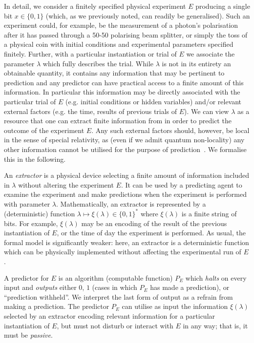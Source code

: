 \documentclass[%
 superscriptaddress,
 preprint,
 showpacs,
 showkeys,
 preprintnumbers,
 nofootinbib,
  amsmath,amssymb,
  aps,
 pra,
  longbibliography,
  floatfix,
 ]{revtex4-1}
\theoremstyle{definition}
\begin{document}
In detail, we consider a finitely specified physical experiment $E$ producing a single bit $x\in\{0,1\}$ (which, as we previously noted, can readily be generalised).
Such an experiment could, for example, be the measurement of a photon's polarisation after it has passed through a 50-50 polarising beam splitter, or simply the toss of a physical coin with initial conditions and experimental parameters specified finitely.
Further, with a particular instantiation or trial of $E$ we associate the parameter $\lambda$  which fully describes the trial.
While $\lambda$ is not in its entirety an obtainable quantity, it contains any information that may be pertinent to prediction and any predictor can have practical access to a finite amount of this information.
In particular this information may be   directly associated with the particular trial of $E$ (e.g. initial conditions or hidden variables) and/or relevant external factors (e.g. the time, results of previous trials of $E$). We can view $\lambda$ as a resource that one can extract finite information from in order   to predict the outcome of the experiment $E$.
Any such external factors should, however, be local in the sense of special relativity, as (even if we admit quantum non-locality) any other information cannot be utilised for the purpose of prediction~\cite{laloe-2012}.
We formalise this in the following.


An \emph{extractor} is a physical device selecting a finite amount of information included in $\lambda$ without altering the experiment $E$.
It can be used by a predicting agent to examine the experiment and make predictions when the experiment is performed with parameter $\lambda$. 
Mathematically, an extractor is represented by a (deterministic) function $\lambda \mapsto \xi(\lambda)\in\{0,1\}^*$ where $\xi(\lambda)$ is a finite string of bits. 
For example, $\xi(\lambda)$ may be an encoding of the result of the previous instantiation of $E$, or the time of day the experiment is performed. 
As usual, the formal model is significantly weaker: here, an extractor is a deterministic function which can be physically implemented without affecting the experimental run of $E$.

A predictor for $E$ is an algorithm  (computable function) $P_E$ which \emph{halts} on every input and \emph{outputs} either $0$, $1$ (cases in which  $P_E$ has made a prediction), or ``prediction withheld''.
We interpret the last form of output as a refrain from making a prediction.
The predictor $P_E$ can utilise as input the information $\xi(\lambda)$ selected by an extractor
encoding  relevant information for a particular instantiation of $E$, but must not disturb or interact with $E$ in any way;
that is, it must be \emph{passive}.
\end{document}
